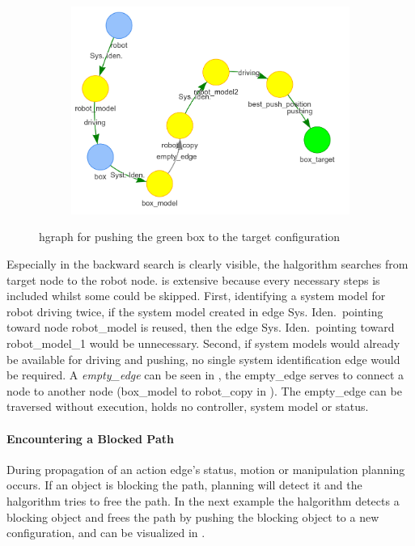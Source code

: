 \begin{figure}[H]
\begin{subfigure}{.3\textwidth}
    \includegraphics[width=1.05\textwidth]{figures/connecting_nodes/robot_push/robot_push_9}
    \caption{}\label{subfig:robot_push_9}
    \end{subfigure}
    \caption{\ac{hgraph} for pushing the green box to the target configuration}%
    \label{fig:robot_push_hgraph}
\end{figure}
Especially in  the backward search is clearly visible, the \ac{halgorithm} searches from target node to the robot node.  is extensive because every necessary steps is included whilst some could be skipped. First, identifying a system model for robot driving twice, if the system model created in edge Sys. Iden.~pointing toward node robot\_model is reused, then the edge Sys. Iden.~pointing toward robot\_model\_1 would be unnecessary. Second, if system models would already be available for driving and pushing, no single system identification edge would be required. A \textit{empty\_edge} can be seen in , the empty\_edge serves to connect a node to another node (box\_model to robot\_copy in ). The empty\_edge can be traversed without execution, holds no controller, system model or status.\bs

\paragraph{Encountering a Blocked Path}%
During propagation of an action edge's status, motion or manipulation planning occurs. If an object is blocking the path, planning will detect it and the \ac{halgorithm} tries to free the path. In the next example the \ac{halgorithm} detects a blocking object and frees the path by pushing the blocking object to a new configuration, and can be visualized in .\bs

